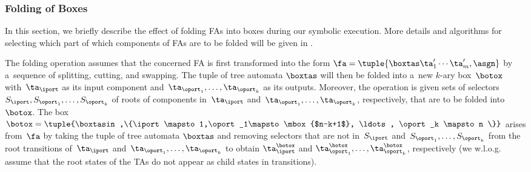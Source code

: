 
\subsubsection*{Folding of Boxes}\label{sec:box_folding}


In this section, we briefly describe the effect of folding FAs into boxes during our
symbolic execution.
More details and algorithms for selecting which part of which components of FAs are
to be folded will be given in .

The folding operation assumes that the concerned FA is first transformed into the form
$\fa = \tuple{\boxtas \ta_1' \cdots \ta_m',\asgn}$ by a~sequence of splitting,
cutting, and swapping.
The tuple of tree automata $\boxtas$ will then be folded into a~new $k$-ary
box~$\botox$ with~$\ta_\iport$ as its input component and~$\ta_{\oport_1},
\ldots, \ta_{\oport_k}$ as its outputs.
Moreover, the operation is given sets of selectors~$S_{\iport},
S_{\oport_1}, \ldots, S_{\oport_k}$ of roots of components in~$\ta_\iport$
and~$\ta_{\oport_1}, \ldots, \ta_{\oport_k}$, respectively, that are to be folded
into~$\botox$.
%
The box~$\botox =
\tuple{\boxtasin,\{\iport\mapsto 1,\oport_1\mapsto \mbox{$n-k+1$}, \ldots, \oport_k
\mapsto n \}}$
 arises from~$\fa$ by taking the tuple of tree automata $\boxtas$
%
and removing selectors that are not in~$S_{\iport}$ and~$S_{\oport_1},
\ldots, S_{\oport_k}$
from the root transitions of~$\ta_\iport$ and~$\ta_{\oport_1}, \ldots, \ta_{\oport_k}$ to obtain $\ta_\iport^\botox$ and
$\ta^\botox_{\oport_1}, \ldots, \ta^\botox_{\oport_k}$, respectively (we w.l.o.g. assume that the root states of the TAs do not appear as child states in transitions).

